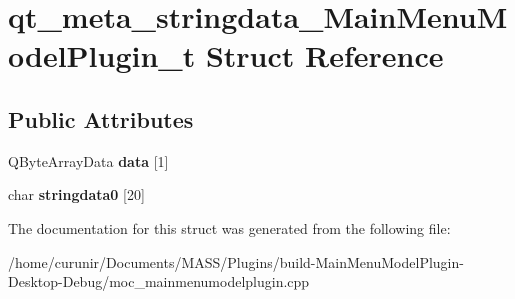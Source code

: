 \hypertarget{structqt__meta__stringdata___main_menu_model_plugin__t}{}\section{qt\+\_\+meta\+\_\+stringdata\+\_\+\+Main\+Menu\+Model\+Plugin\+\_\+t Struct Reference}
\label{structqt__meta__stringdata___main_menu_model_plugin__t}
\subsection*{Public Attributes}
\begin{DoxyCompactItemize}
\item 
Q\+Byte\+Array\+Data {\bfseries data} \mbox{[}1\mbox{]}\hypertarget{structqt__meta__stringdata___main_menu_model_plugin__t_a1de01247619e04ece52ade945f260169}{}\label{structqt__meta__stringdata___main_menu_model_plugin__t_a1de01247619e04ece52ade945f260169}

\item 
char {\bfseries stringdata0} \mbox{[}20\mbox{]}\hypertarget{structqt__meta__stringdata___main_menu_model_plugin__t_acb8cbbc19e905764a69736ff744030b4}{}\label{structqt__meta__stringdata___main_menu_model_plugin__t_acb8cbbc19e905764a69736ff744030b4}

\end{DoxyCompactItemize}


The documentation for this struct was generated from the following file\+:\begin{DoxyCompactItemize}
\item 
/home/curunir/\+Documents/\+M\+A\+S\+S/\+Plugins/build-\/\+Main\+Menu\+Model\+Plugin-\/\+Desktop-\/\+Debug/moc\+\_\+mainmenumodelplugin.\+cpp\end{DoxyCompactItemize}
